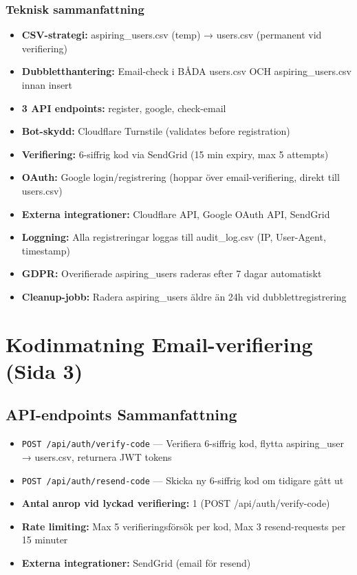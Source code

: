 \documentclass[12pt,a4paper]{article}
\begin{document}
\subsubsection{Teknisk sammanfattning}
\begin{itemize}[noitemsep]
  \item \textbf{CSV-strategi:} aspiring\_users.csv (temp) → users.csv (permanent vid verifiering)
  \item \textbf{Dubbletthantering:} Email-check i BÅDA users.csv OCH aspiring\_users.csv innan insert
  \item \textbf{3 API endpoints:} register, google, check-email
  \item \textbf{Bot-skydd:} Cloudflare Turnstile (validates before registration)
  \item \textbf{Verifiering:} 6-siffrig kod via SendGrid (15 min expiry, max 5 attempts)
  \item \textbf{OAuth:} Google login/registrering (hoppar över email-verifiering, direkt till users.csv)
  \item \textbf{Externa integrationer:} Cloudflare API, Google OAuth API, SendGrid
  \item \textbf{Loggning:} Alla registreringar loggas till audit\_log.csv (IP, User-Agent, timestamp)
  \item \textbf{GDPR:} Overifierade aspiring\_users raderas efter 7 dagar automatiskt
  \item \textbf{Cleanup-jobb:} Radera aspiring\_users äldre än 24h vid dubblettregistrering
\end{itemize}

\newpage


\section{Kodinmatning Email-verifiering (Sida 3)}

\subsection{API-endpoints Sammanfattning}
\begin{itemize}[noitemsep]
  \item \texttt{POST /api/auth/verify-code} — Verifiera 6-siffrig kod, flytta aspiring\_user → users.csv, returnera JWT tokens
  \item \texttt{POST /api/auth/resend-code} — Skicka ny 6-siffrig kod om tidigare gått ut
  \item \textbf{Antal anrop vid lyckad verifiering:} 1 (POST /api/auth/verify-code)
  \item \textbf{Rate limiting:} Max 5 verifieringsförsök per kod, Max 3 resend-requests per 15 minuter
  \item \textbf{Externa integrationer:} SendGrid (email för resend)
\end{itemize}
\end{document}
